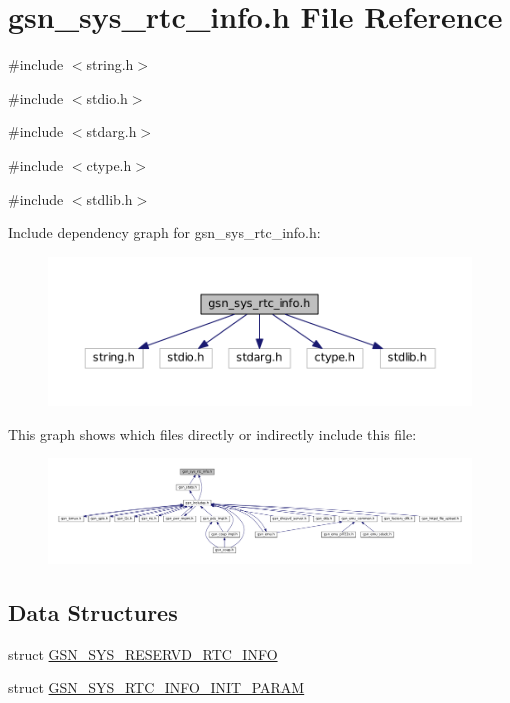 \hypertarget{a00595}{
\section{gsn\_\-sys\_\-rtc\_\-info.h File Reference}
\label{a00595}
}
{\ttfamily \#include $<$string.h$>$}\par
{\ttfamily \#include $<$stdio.h$>$}\par
{\ttfamily \#include $<$stdarg.h$>$}\par
{\ttfamily \#include $<$ctype.h$>$}\par
{\ttfamily \#include $<$stdlib.h$>$}\par
Include dependency graph for gsn\_\-sys\_\-rtc\_\-info.h:
\nopagebreak
\begin{figure}[H]
\begin{center}
\leavevmode
\includegraphics[width=400pt]{a00840}
\end{center}
\end{figure}
This graph shows which files directly or indirectly include this file:
\nopagebreak
\begin{figure}[H]
\begin{center}
\leavevmode
\includegraphics[width=400pt]{a00841}
\end{center}
\end{figure}
\subsection*{Data Structures}
\begin{DoxyCompactItemize}
\item 
struct \hyperlink{a00255}{GSN\_\-SYS\_\-RESERVD\_\-RTC\_\-INFO}
\item 
struct \hyperlink{a00259}{GSN\_\-SYS\_\-RTC\_\-INFO\_\-INIT\_\-PARAM}
\end{DoxyCompactItemize}
